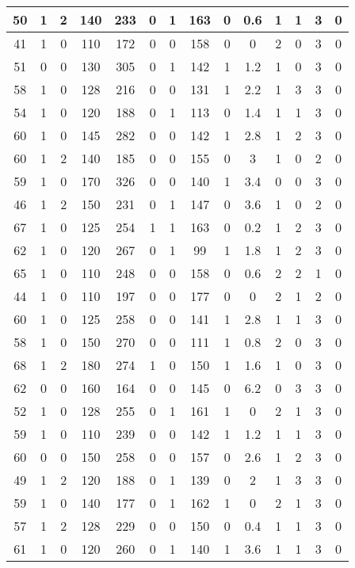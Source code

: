 \documentclass{article}
\begin{document}
\begin{longtable}{|c|c|c|c|c|c|c|c|c|c|c|c|c|c|}
\hline
50 & 1 & 2 & 140 & 233 & 0 & 1 & 163 & 0 & 0.6 & 1 & 1 & 3 & 0\\
\hline
41 & 1 & 0 & 110 & 172 & 0 & 0 & 158 & 0 & 0 & 2 & 0 & 3 & 0\\
\hline
51 & 0 & 0 & 130 & 305 & 0 & 1 & 142 & 1 & 1.2 & 1 & 0 & 3 & 0\\
\hline
58 & 1 & 0 & 128 & 216 & 0 & 0 & 131 & 1 & 2.2 & 1 & 3 & 3 & 0\\
\hline
54 & 1 & 0 & 120 & 188 & 0 & 1 & 113 & 0 & 1.4 & 1 & 1 & 3 & 0\\
\hline
60 & 1 & 0 & 145 & 282 & 0 & 0 & 142 & 1 & 2.8 & 1 & 2 & 3 & 0\\
\hline
60 & 1 & 2 & 140 & 185 & 0 & 0 & 155 & 0 & 3 & 1 & 0 & 2 & 0\\
\hline
59 & 1 & 0 & 170 & 326 & 0 & 0 & 140 & 1 & 3.4 & 0 & 0 & 3 & 0\\
\hline
46 & 1 & 2 & 150 & 231 & 0 & 1 & 147 & 0 & 3.6 & 1 & 0 & 2 & 0\\
\hline
67 & 1 & 0 & 125 & 254 & 1 & 1 & 163 & 0 & 0.2 & 1 & 2 & 3 & 0\\
\hline
62 & 1 & 0 & 120 & 267 & 0 & 1 & 99 & 1 & 1.8 & 1 & 2 & 3 & 0\\
\hline
65 & 1 & 0 & 110 & 248 & 0 & 0 & 158 & 0 & 0.6 & 2 & 2 & 1 & 0\\
\hline
44 & 1 & 0 & 110 & 197 & 0 & 0 & 177 & 0 & 0 & 2 & 1 & 2 & 0\\
\hline
60 & 1 & 0 & 125 & 258 & 0 & 0 & 141 & 1 & 2.8 & 1 & 1 & 3 & 0\\
\hline
58 & 1 & 0 & 150 & 270 & 0 & 0 & 111 & 1 & 0.8 & 2 & 0 & 3 & 0\\
\hline
68 & 1 & 2 & 180 & 274 & 1 & 0 & 150 & 1 & 1.6 & 1 & 0 & 3 & 0\\
\hline
62 & 0 & 0 & 160 & 164 & 0 & 0 & 145 & 0 & 6.2 & 0 & 3 & 3 & 0\\
\hline
52 & 1 & 0 & 128 & 255 & 0 & 1 & 161 & 1 & 0 & 2 & 1 & 3 & 0\\
\hline
59 & 1 & 0 & 110 & 239 & 0 & 0 & 142 & 1 & 1.2 & 1 & 1 & 3 & 0\\
\hline
60 & 0 & 0 & 150 & 258 & 0 & 0 & 157 & 0 & 2.6 & 1 & 2 & 3 & 0\\
\hline
49 & 1 & 2 & 120 & 188 & 0 & 1 & 139 & 0 & 2 & 1 & 3 & 3 & 0\\
\hline
59 & 1 & 0 & 140 & 177 & 0 & 1 & 162 & 1 & 0 & 2 & 1 & 3 & 0\\
\hline
57 & 1 & 2 & 128 & 229 & 0 & 0 & 150 & 0 & 0.4 & 1 & 1 & 3 & 0\\
\hline
61 & 1 & 0 & 120 & 260 & 0 & 1 & 140 & 1 & 3.6 & 1 & 1 & 3 & 0\\

\end{longtable}
\end{document}
